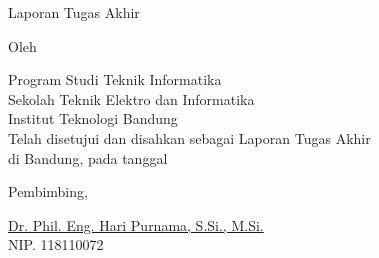 \clearpage
\pagestyle{empty}

\begin{center}
	\smallskip

	\Large \bfseries \MakeUppercase{\thetitle}
	\vfill

	\Large Laporan Tugas Akhir
	\vfill

	\large Oleh

	\Large \theauthor

	\large Program Studi Teknik Informatika \\

	\normalsize \normalfont
	Sekolah Teknik Elektro dan Informatika \\
	Institut Teknologi Bandung \\

	\vfill
	\normalsize \normalfont
	Telah disetujui dan disahkan sebagai Laporan Tugas Akhir \\
	di Bandung, pada tanggal \tanggalpengesahan

	\vspace{0.5cm}
	Pembimbing,

	\vfill
	\underline{Dr. Phil. Eng. Hari Purnama, S.Si., M.Si.
	} \\
	NIP. 118110072

\end{center}
\clearpage
